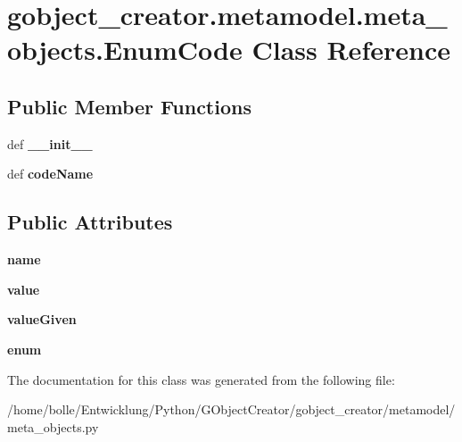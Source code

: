 \hypertarget{classgobject__creator_1_1metamodel_1_1meta__objects_1_1EnumCode}{
\section{gobject\_\-creator.metamodel.meta\_\-objects.EnumCode Class Reference}
\label{classgobject__creator_1_1metamodel_1_1meta__objects_1_1EnumCode}
}
\subsection*{Public Member Functions}
\begin{DoxyCompactItemize}
\item 
\hypertarget{classgobject__creator_1_1metamodel_1_1meta__objects_1_1EnumCode_ac6fd460802bac46a87570e71a86bd6b4}{
def {\bfseries \_\-\_\-init\_\-\_\-}}
\label{classgobject__creator_1_1metamodel_1_1meta__objects_1_1EnumCode_ac6fd460802bac46a87570e71a86bd6b4}

\item 
\hypertarget{classgobject__creator_1_1metamodel_1_1meta__objects_1_1EnumCode_af2cf059c4d7e2888f2814b9120d99b3e}{
def {\bfseries codeName}}
\label{classgobject__creator_1_1metamodel_1_1meta__objects_1_1EnumCode_af2cf059c4d7e2888f2814b9120d99b3e}

\end{DoxyCompactItemize}
\subsection*{Public Attributes}
\begin{DoxyCompactItemize}
\item 
\hypertarget{classgobject__creator_1_1metamodel_1_1meta__objects_1_1EnumCode_a67346c2023c1ce86a587922f2f53f67a}{
{\bfseries name}}
\label{classgobject__creator_1_1metamodel_1_1meta__objects_1_1EnumCode_a67346c2023c1ce86a587922f2f53f67a}

\item 
\hypertarget{classgobject__creator_1_1metamodel_1_1meta__objects_1_1EnumCode_a0585b4a21b2134dc0e3de6747ab14ec9}{
{\bfseries value}}
\label{classgobject__creator_1_1metamodel_1_1meta__objects_1_1EnumCode_a0585b4a21b2134dc0e3de6747ab14ec9}

\item 
\hypertarget{classgobject__creator_1_1metamodel_1_1meta__objects_1_1EnumCode_a7f90bc312d0fbf15a7b2c1f2ee01742f}{
{\bfseries valueGiven}}
\label{classgobject__creator_1_1metamodel_1_1meta__objects_1_1EnumCode_a7f90bc312d0fbf15a7b2c1f2ee01742f}

\item 
\hypertarget{classgobject__creator_1_1metamodel_1_1meta__objects_1_1EnumCode_af94e18cf878f282226cb0899d9a87975}{
{\bfseries enum}}
\label{classgobject__creator_1_1metamodel_1_1meta__objects_1_1EnumCode_af94e18cf878f282226cb0899d9a87975}

\end{DoxyCompactItemize}


The documentation for this class was generated from the following file:\begin{DoxyCompactItemize}
\item 
/home/bolle/Entwicklung/Python/GObjectCreator/gobject\_\-creator/metamodel/meta\_\-objects.py\end{DoxyCompactItemize}
